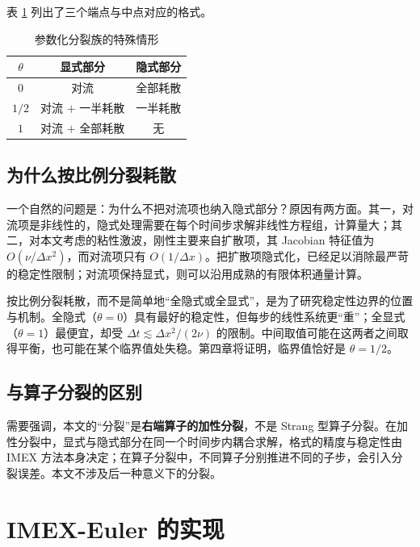 表 \ref{tab:theta-cases} 列出了三个端点与中点对应的格式。

\begin{table}[htbp]
  \centering
  \caption{参数化分裂族的特殊情形}
  \label{tab:theta-cases}
  \begin{tabular}{ccc}
    \toprule
    $\theta$ & 显式部分 & 隐式部分 \\
    \midrule
    $0$ & 对流 & 全部耗散 \\
    $1/2$ & 对流 $+$ 一半耗散 & 一半耗散 \\
    $1$ & 对流 $+$ 全部耗散 & 无 \\
    \bottomrule
  \end{tabular}
\end{table}

\subsection{为什么按比例分裂耗散}

一个自然的问题是：为什么不把对流项也纳入隐式部分？原因有两方面。其一，对流项是非线性的，隐式处理需要在每个时间步求解非线性方程组，计算量大；其二，对本文考虑的粘性激波，刚性主要来自扩散项，其 Jacobian 特征值为 $O(\nu/\Delta x^2)$，而对流项只有 $O(1/\Delta x)$。把扩散项隐式化，已经足以消除最严苛的稳定性限制；对流项保持显式，则可以沿用成熟的有限体积通量计算。

按比例分裂耗散，而不是简单地“全隐式或全显式”，是为了研究稳定性边界的位置与机制。全隐式（$\theta=0$）具有最好的稳定性，但每步的线性系统更“重”；全显式（$\theta=1$）最便宜，却受 $\Delta t\lesssim\Delta x^2/(2\nu)$ 的限制。中间取值可能在这两者之间取得平衡，也可能在某个临界值处失稳。第四章将证明，临界值恰好是 $\theta=1/2$。

\subsection{与算子分裂的区别}

需要强调，本文的“分裂”是\textbf{右端算子的加性分裂}，不是 Strang 型算子分裂\cite{strang1968}。在加性分裂中，显式与隐式部分在同一个时间步内耦合求解，格式的精度与稳定性由 IMEX 方法本身决定；在算子分裂中，不同算子分别推进不同的子步，会引入分裂误差。本文不涉及后一种意义下的分裂。

\section{IMEX-Euler 的实现}
\label{sec:imex-implementation}

